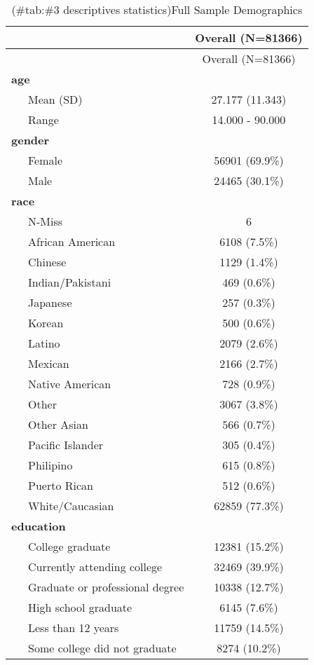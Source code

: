 \documentclass[
]{article}
\begin{document}
\begin{longtable}[]{@{}lc@{}}
\caption{(\#tab:\#3 descriptives statistics)Full Sample Demographics}\tabularnewline
\toprule
& Overall (N=81366) \\
\midrule
\endfirsthead
\toprule
& Overall (N=81366) \\
\midrule
\endhead
\textbf{age} & \\
~~~Mean (SD) & 27.177 (11.343) \\
~~~Range & 14.000 - 90.000 \\
\textbf{gender} & \\
~~~Female & 56901 (69.9\%) \\
~~~Male & 24465 (30.1\%) \\
\textbf{race} & \\
~~~N-Miss & 6 \\
~~~African American & 6108 (7.5\%) \\
~~~Chinese & 1129 (1.4\%) \\
~~~Indian/Pakistani & 469 (0.6\%) \\
~~~Japanese & 257 (0.3\%) \\
~~~Korean & 500 (0.6\%) \\
~~~Latino & 2079 (2.6\%) \\
~~~Mexican & 2166 (2.7\%) \\
~~~Native American & 728 (0.9\%) \\
~~~Other & 3067 (3.8\%) \\
~~~Other Asian & 566 (0.7\%) \\
~~~Pacific Islander & 305 (0.4\%) \\
~~~Philipino & 615 (0.8\%) \\
~~~Puerto Rican & 512 (0.6\%) \\
~~~White/Caucasian & 62859 (77.3\%) \\
\textbf{education} & \\
~~~College graduate & 12381 (15.2\%) \\
~~~Currently attending college & 32469 (39.9\%) \\
~~~Graduate or professional degree & 10338 (12.7\%) \\
~~~High school graduate & 6145 (7.6\%) \\
~~~Less than 12 years & 11759 (14.5\%) \\
~~~Some college did not graduate & 8274 (10.2\%) \\
\bottomrule
\end{longtable}
\end{document}
